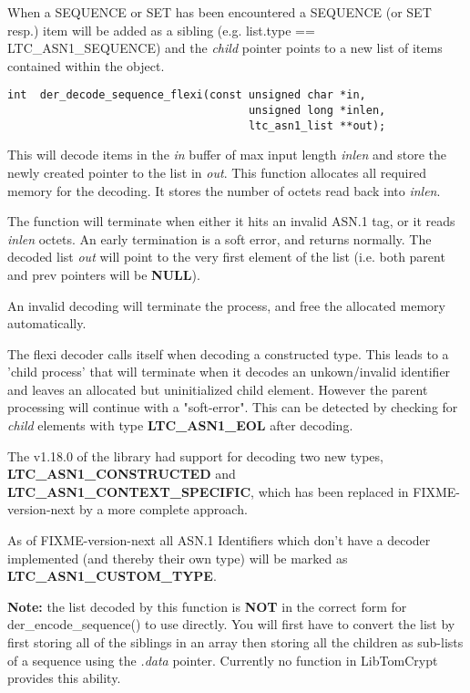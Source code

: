 \documentclass[synpaper]{book}
\begin{document}
When a SEQUENCE or SET has been encountered a SEQUENCE (or SET resp.) item will be added as a sibling (e.g. list.type == LTC\_ASN1\_SEQUENCE) and the \textit{child}
pointer points to a new list of items contained within the object.

\begin{verbatim}
int  der_decode_sequence_flexi(const unsigned char *in,
                                     unsigned long *inlen,
                                     ltc_asn1_list **out);
\end{verbatim}

This will decode items in the \textit{in} buffer of max input length \textit{inlen} and store the newly created pointer to the list in \textit{out}.  This function allocates
all required memory for the decoding.  It stores the number of octets read back into \textit{inlen}.

The function will terminate when either it hits an invalid ASN.1 tag, or it reads \textit{inlen} octets.  An early termination is a soft error, and returns
normally.  The decoded list \textit{out} will point to the very first element of the list (i.e. both parent and prev pointers will be \textbf{NULL}).

An invalid decoding will terminate the process, and free the allocated memory automatically.

The flexi decoder calls itself when decoding a constructed type. This leads to
a 'child process' that will terminate when it decodes an unkown/invalid
identifier and leaves an allocated but uninitialized child element.
However the parent processing will continue with a "soft-error".
This can be detected by checking for \textit{child} elements with
type \textbf{LTC\_ASN1\_EOL} after decoding.

The v1.18.0 of the library had support for decoding two new types, \textbf{LTC\_ASN1\_CONSTRUCTED} and \textbf{LTC\_ASN1\_CONTEXT\_SPECIFIC},
which has been replaced in FIXME-version-next by a more complete approach.

As of FIXME-version-next all ASN.1 Identifiers which don't have a decoder implemented (and thereby their own type) will be marked as
\textbf{LTC\_ASN1\_CUSTOM\_TYPE}.


\textbf{Note:} the list decoded by this function is \textbf{NOT} in the correct form for der\_encode\_sequence() to use directly.  You will first
have to convert the list by first storing all of the siblings in an array then storing all the children as sub-lists of a sequence using the \textit{.data}
pointer.  Currently no function in LibTomCrypt provides this ability.
\end{document}
